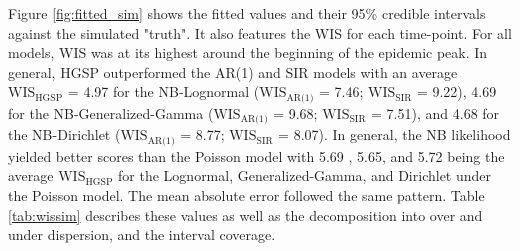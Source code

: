 \documentclass[12pt]{article}
\begin{document}
Figure \ref{fig:fitted_sim} shows the fitted values and their 95\% credible intervals against the simulated "truth". It also features the WIS for each time-point. For all models, WIS was at its highest around the beginning of the epidemic peak. In general, HGSP outperformed the AR(1) and SIR models with an average $\text{WIS}_{\text{HGSP}}$ = 4.97 for the NB-Lognormal ($\text{WIS}_{\text{AR(1)}}$ = 7.46; $\text{WIS}_{\text{SIR}}$ = 9.22), 4.69 for the NB-Generalized-Gamma ($\text{WIS}_{\text{AR(1)}}$ = 9.68; $\text{WIS}_{\text{SIR}}$ = 7.51), and 4.68 for the NB-Dirichlet ($\text{WIS}_{\text{AR(1)}}$ = 8.77; $\text{WIS}_{\text{SIR}}$ = 8.07). In general, the NB likelihood yielded better scores than the Poisson model with 5.69 , 5.65, and 5.72 being the average $\text{WIS}_{\text{HGSP}}$ for the Lognormal, Generalized-Gamma, and Dirichlet under the Poisson model. The mean absolute error followed the same pattern. Table \ref{tab:wissim} describes these values as well as the decomposition into over and under dispersion, and the interval coverage. 
\end{document}
